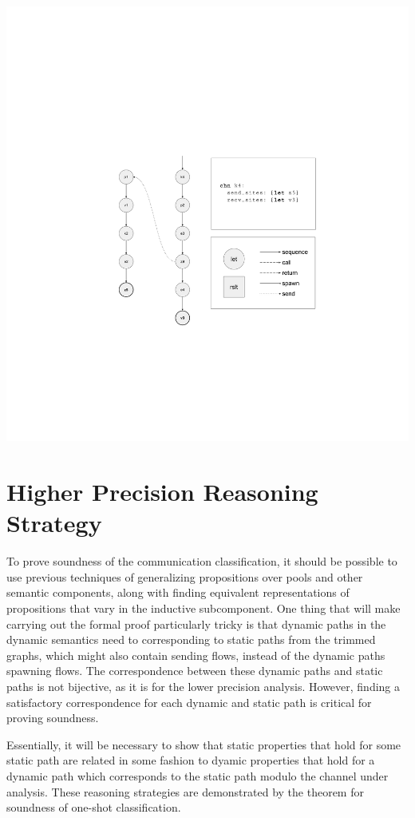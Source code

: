 \documentclass[10pt]{article}
\begin{document}
\includegraphics[width=1.3\textwidth, left]{cml_graph_k4.pdf}

\section{Higher Precision Reasoning Strategy}
To prove soundness of the communication classification, it should be possible to use
previous techniques of generalizing propositions over pools and other semantic components,
along with finding equivalent representations of propositions that vary in the inductive
subcomponent. One thing that will make carrying out the formal proof particularly tricky is
that dynamic paths in the dynamic semantics need to corresponding to static paths from
the trimmed graphs, which might also contain sending flows,
instead of the dynamic paths spawning flows.
The correspondence between these dynamic paths and static paths
is not bijective, as it is for the lower precision analysis. However, finding a satisfactory
correspondence for each dynamic and static path is critical for proving soundness.

Essentially, it will be necessary to show that static
properties that hold for some static path are related in some fashion to dyamic properties
that hold for a dynamic path which corresponds to the static path modulo the channel under
analysis. These reasoning strategies are demonstrated by the theorem for soundness of
one-shot classification.
\end{document}
